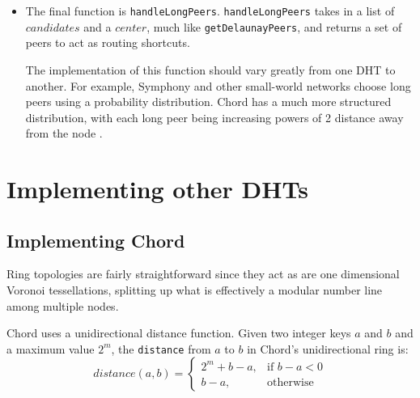\documentclass[11pt,conference]{IEEEtran}
\begin{document}
\begin{itemize}

\item The final function is \texttt{handleLongPeers}.
\texttt{handleLongPeers} takes in a list of $ candidates $ and a $ center$, much like \texttt{getDelaunayPeers}, and returns a set of peers to act as routing shortcuts.


The implementation of this function should vary greatly from one DHT to another.
For example, Symphony \cite{symphony} and other small-world \cite{kleinberg2000navigation} networks choose long peers using a probability distribution.
Chord has a much more structured distribution, with each long peer being increasing powers of 2 distance away from the node \cite{chord}.




\end{itemize}






\section{Implementing other DHTs}
\label{sec:implement}
\subsection{Implementing Chord}

Ring topologies are fairly straightforward since they act as are one dimensional Voronoi tessellations, splitting up what is effectively a modular number line among multiple nodes.

Chord uses a unidirectional distance function.
Given two integer keys $ a $ and $ b $ and a maximum value $ 2^{m} $, the \texttt{distance} from $ a $ to $ b $ in Chord's unidirectional ring is: 
\[ distance(a,b) =
\begin{cases}
	2^m + b - a, & \text{if } b - a < 0 \\
	b-a, & \text{otherwise}
\end{cases}
  \]
\end{document}
